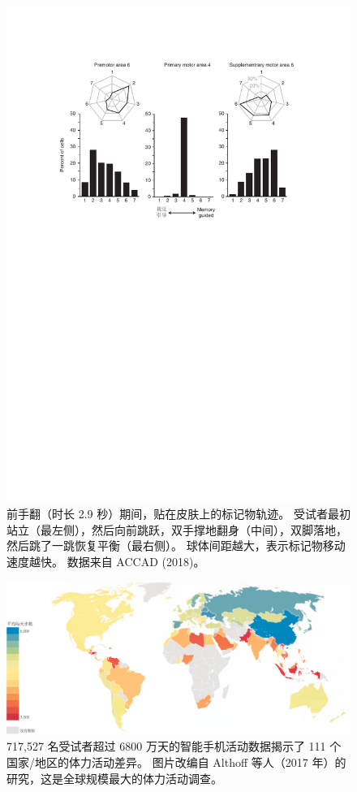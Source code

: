 \begin{figure}[!htb]
	\centering
	\includegraphics[width=1.0\linewidth]{chap1/1_10}
	\caption{前手翻（时长 2.9 秒）期间，贴在皮肤上的标记物轨迹。
		受试者最初站立（最左侧），然后向前跳跃，双手撑地翻身（中间），双脚落地，然后跳了一跳恢复平衡（最右侧）。
		球体间距越大，表示标记物移动速度越快。
		数据来自 ACCAD (2018)。 \label{fig:1_10}}
\end{figure}


\begin{figure}[!htb]
	\centering
	\includegraphics[width=1.0\linewidth]{chap1/1_11}
	\caption{717,527 名受试者超过 6800 万天的智能手机活动数据揭示了 111 个国家/地区的体力活动差异。
		图片改编自 Althoff 等人（2017 年）的研究，这是全球规模最大的体力活动调查。 \label{fig:1_11}}
\end{figure}


